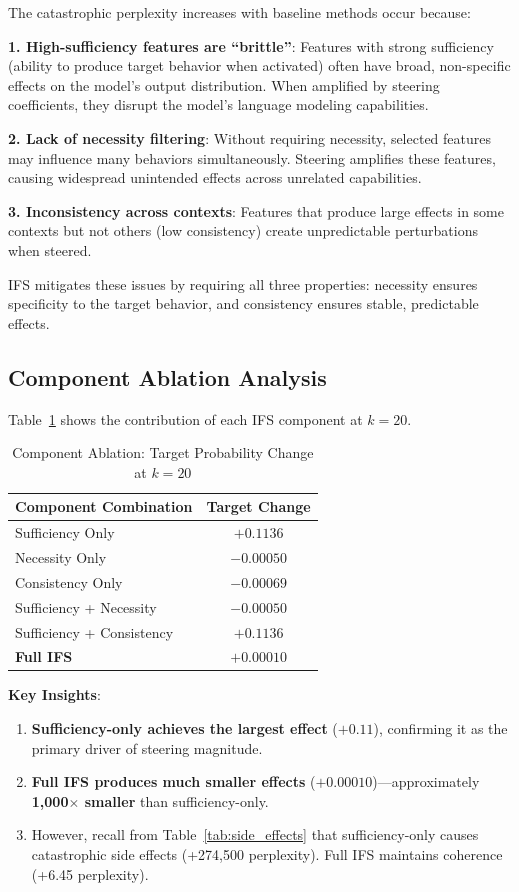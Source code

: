 \documentclass{article}
\begin{document}
The catastrophic perplexity increases with baseline methods occur because:

\textbf{1. High-sufficiency features are ``brittle''}: Features with strong sufficiency (ability to produce target behavior when activated) often have broad, non-specific effects on the model's output distribution. When amplified by steering coefficients, they disrupt the model's language modeling capabilities.

\textbf{2. Lack of necessity filtering}: Without requiring necessity, selected features may influence many behaviors simultaneously. Steering amplifies these features, causing widespread unintended effects across unrelated capabilities.

\textbf{3. Inconsistency across contexts}: Features that produce large effects in some contexts but not others (low consistency) create unpredictable perturbations when steered.

IFS mitigates these issues by requiring all three properties: necessity ensures specificity to the target behavior, and consistency ensures stable, predictable effects.

\subsection{Component Ablation Analysis}

Table~\ref{tab:ablation} shows the contribution of each IFS component at $k=20$.

\begin{table}[t]
\caption{Component Ablation: Target Probability Change at $k=20$}
\label{tab:ablation}
\centering
\begin{tabular}{lc}
\toprule
Component Combination & Target Change \\
\midrule
Sufficiency Only & $+0.1136$ \\
Necessity Only & $-0.00050$ \\
Consistency Only & $-0.00069$ \\
Sufficiency + Necessity & $-0.00050$ \\
Sufficiency + Consistency & $+0.1136$ \\
\midrule
\textbf{Full IFS} & $\mathbf{+0.00010}$ \\
\bottomrule
\end{tabular}
\end{table}

\textbf{Key Insights}:
\begin{enumerate}
    \item \textbf{Sufficiency-only achieves the largest effect} ($+0.11$), confirming it as the primary driver of steering magnitude.
    \item \textbf{Full IFS produces much smaller effects} ($+0.00010$)---approximately \textbf{1,000$\times$ smaller} than sufficiency-only.
    \item However, recall from Table~\ref{tab:side_effects} that sufficiency-only causes catastrophic side effects (+274,500 perplexity). Full IFS maintains coherence (+6.45 perplexity).
\end{enumerate}
\end{document}
